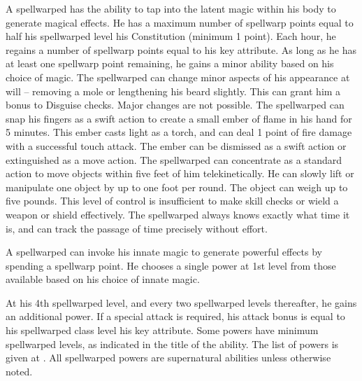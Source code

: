  A spellwarped has the ability to tap into the latent magic within his body to generate magical effects. He has a maximum number of spellwarp points equal to half his spellwarped level \add his Constitution (minimum 1 point). Each hour, he regains a number of spellwarp points equal to his key attribute. As long as he has at least one spellwarp point remaining, he gains a minor ability based on his choice of magic.
 The spellwarped can change minor aspects of his appearance at will -- removing a mole or lengthening his beard slightly. This can grant him a  bonus to Disguise checks. Major changes are not possible.
 The spellwarped can snap his fingers as a swift action to create a small ember of flame in his hand for 5 minutes. This ember casts light as a torch, and can deal 1 point of fire damage with a successful touch attack. The ember can be dismissed as a swift action or extinguished as a move action.
 The spellwarped can concentrate as a standard action to move objects within five feet of him telekinetically. He can slowly lift or manipulate one object by up to one foot per round. The object can weigh up to five pounds. This level of control is insufficient to make skill checks or wield a weapon or shield effectively.
 The spellwarped always knows exactly what time it is, and can track the passage of time precisely without effort.

 A spellwarped can invoke his innate magic to generate powerful effects by spending a spellwarp point. He chooses a single power at 1st level from those available based on his choice of innate magic.

At his 4th spellwarped level, and every two spellwarped levels thereafter, he gains an additional power. If a special attack is required, his attack bonus is equal to his spellwarped class level \add his key attribute. Some powers have minimum spellwarped levels, as indicated in the title of the ability. The list of powers is given at . All spellwarped powers are supernatural abilities unless otherwise noted.

